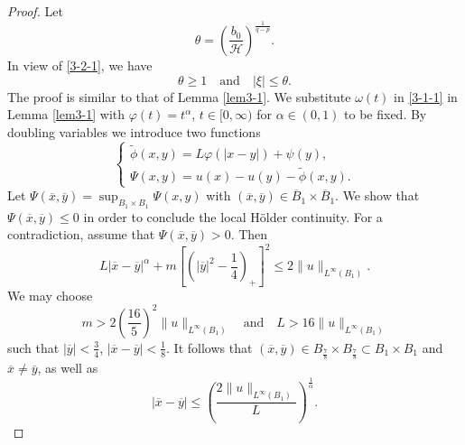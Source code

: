 \documentclass[10pt,a4paper]{amsart}
\begin{document}
\begin{proof}
Let
$$
\theta=\left(\frac{b_0}{\mathcal{H}}\right)^\frac{1}{q-p}.
$$
In view of \eqref{3-2-1}, we have
\begin{equation}
\label{3-2-2}
\theta\ge1 \quad\text{and}\quad |\xi|\le \theta.
\end{equation}
The proof is similar to that of Lemma \ref{lem3-1}. We substitute $\omega(t)$ in \eqref{3-1-1} in Lemma \ref{lem3-1} with
$\varphi(t)=t^\alpha$,  $t\in[0,\infty)$ for $\alpha\in(0,1)$ to be fixed. By doubling variables we introduce two functions
\begin{equation*}
\begin{cases}
\widetilde{\phi}(x,y)=L\varphi(|x-y|)+\psi(y),\\
\Psi(x,y)=u(x)-u(y)-\widetilde{\phi}(x,y).
\end{cases}
\end{equation*}
Let $\Psi(\overline{x},\overline{y})=\sup_{B_1\times B_1}\Psi(x,y)$ with $(\overline{x},\overline{y})\in \overline{B}_1\times\overline{B}_1$. We show that$\Psi(\overline{x},\overline{y})\le0$
in order to conclude the local H\"{o}lder continuity.
For a contradiction, assume that $\Psi(\overline{x},\overline{y})>0$.
Then
$$
L|\overline{x}-\overline{y}|^\alpha+m\left[\left(|\overline{y}|^2-\frac{1}{4}\right)_+\right]^2\le2\|u\|_{L^\infty(B_1)}.
$$
We may choose
$$
m>2\left(\frac{16}{5}\right)^2\|u\|_{L^\infty(B_1)}
\quad\text{and}\quad
L>16\|u\|_{L^\infty(B_1)}
$$
such that $|\overline{y}|<\frac{3}{4}$, $|\overline{x}-\overline{y}|<\frac{1}{8}$.
It follows that $(\overline{x},\overline{y})\in B_\frac{7}{8}\times B_\frac{7}{8}\subset B_1\times B_1$ and $\overline{x}\neq\overline{y}$, as well as
\begin{equation}
\label{3-2-3}
|\overline{x}-\overline{y}|\le\left(\frac{2\|u\|_{L^\infty(B_1)}}{L}\right)^\frac{1}{\alpha}.
\end{equation}


\end{proof}
\end{document}
